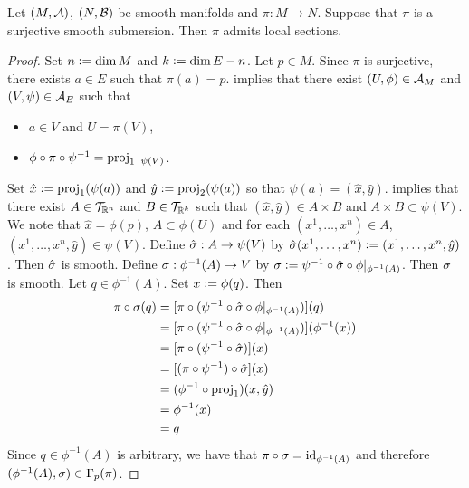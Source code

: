 \documentclass{book}
\begin{document}
	\begin{ex} 
		Let $(M, \mathcal{A})$, $(N, \mathcal{B})$ be smooth manifolds and $\pi: M \rightarrow N$. Suppose that $\pi$ is a surjective smooth submersion. Then $\pi$ admits local sections. 
	\end{ex}

	\begin{proof}
		Set $n \vcentcolon= \dim M$ and $k \vcentcolon= \dim E - n$. Let $p \in M$. Since $\pi$ is surjective, there exists $a \in E$ such that $\pi(a) = p$.  implies that there exist $(U, \phi) \in \mathcal{A}_M$ and $(V, \psi) \in \mathcal{A}_E$ such that 
		\begin{itemize}
			\item $a \in V$ and $U = \pi(V)$,
			\item $\phi \circ \pi \circ \psi^{-1} = \operatorname{\text{proj}}_1|_{\psi(V)}$. 
		\end{itemize} 
		Set $\hat{x} \vcentcolon= \operatorname{\text{proj}}_1(\psi(a))$ and $\hat{y} \vcentcolon= \operatorname{\text{proj}}_2(\psi(a))$ so that $\psi(a) = (\hat{x}, \hat{y})$.  implies that there exist $A \in \mathcal{T}_{\mathbb{R}^n}$ and $B \in \mathcal{T}_{\mathbb{R}^k}$ such that $(\hat{x}, \hat{y}) \in A \times B$ and $A \times B \subset \psi(V)$. We note that $\hat{x} = \phi(p)$, $A \subset \phi(U)$ and for each $(x^1, \ldots, x^n) \in A$, $(x^1, \ldots, x^n, \hat{y}) \in \psi(V)$. Define $\hat{\sigma}:A \rightarrow \psi(V)$ by $\hat{\sigma}(x^1, \ldots, x^n) \vcentcolon= (x^1, \ldots, x^n, \hat{y})$. Then $\hat{\sigma}$ is smooth. Define $\sigma:\phi^{-1}(A) \rightarrow V$ by $\sigma \vcentcolon= \psi^{-1} \circ \hat{\sigma} \circ \phi|_{\phi^{-1}(A)}$. Then $\sigma$ is smooth. Let $q \in \phi^{-1}(A)$. Set $x \vcentcolon= \phi(q)$. Then 
		\begin{align*}
			\pi \circ \sigma (q)
			& = [\pi \circ (\psi^{-1} \circ \hat{\sigma} \circ \phi|_{\phi^{-1}(A)})] (q) \\
			& = [\pi \circ (\psi^{-1} \circ \hat{\sigma} \circ \phi|_{\phi^{-1}(A)})] (\phi^{-1}(x)) \\
			& = [\pi \circ (\psi^{-1} \circ \hat{\sigma})] (x) \\
			& = [(\pi \circ \psi^{-1}) \circ \hat{\sigma}] (x) \\
			& = (\phi^{-1} \circ \operatorname{\text{proj}}_1) (x, \hat{y}) \\
			& = \phi^{-1}(x) \\
			& = q
		\end{align*}
		Since $q \in \phi^{-1}(A)$ is arbitrary, we have that $\pi \circ \sigma = \operatorname{id}_{\phi^{-1}(A)}$ and therefore $(\phi^{-1}(A), \sigma) \in \Gamma_{p}(\pi)$.
	\end{proof}
\end{document}
